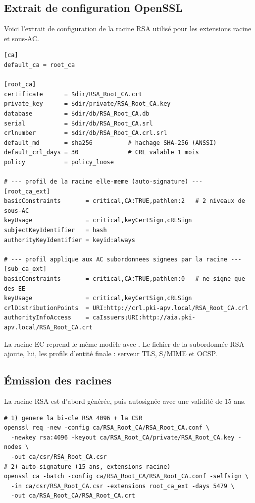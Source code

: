 \documentclass[11pt,a4paper]{article}
\newcommand{\file}[1]{\texttt{\detokenize{#1}}}
\begin{document}
\subsection{Extrait de configuration OpenSSL}
Voici l'extrait de configuration de la racine RSA utilisé pour les extensions racine et sous-AC.

\begin{lstlisting}[style=config]
[ca]
default_ca = root_ca

[root_ca]
certificate      = $dir/RSA_Root_CA.crt
private_key      = $dir/private/RSA_Root_CA.key
database         = $dir/db/RSA_Root_CA.db
serial           = $dir/db/RSA_Root_CA.srl
crlnumber        = $dir/db/RSA_Root_CA.crl.srl
default_md       = sha256          # hachage SHA-256 (ANSSI)
default_crl_days = 30              # CRL valable 1 mois
policy           = policy_loose

# --- profil de la racine elle-meme (auto-signature) ---
[root_ca_ext]
basicConstraints       = critical,CA:TRUE,pathlen:2   # 2 niveaux de sous-AC
keyUsage               = critical,keyCertSign,cRLSign
subjectKeyIdentifier   = hash
authorityKeyIdentifier = keyid:always

# --- profil applique aux AC subordonnees signees par la racine ---
[sub_ca_ext]
basicConstraints       = critical,CA:TRUE,pathlen:0   # ne signe que des EE
keyUsage               = critical,keyCertSign,cRLSign
crlDistributionPoints  = URI:http://crl.pki-apv.local/RSA_Root_CA.crl
authorityInfoAccess    = caIssuers;URI:http://aia.pki-apv.local/RSA_Root_CA.crt
\end{lstlisting}

La racine EC reprend le même modèle avec \file{pathlen:1}. Le fichier de la subordonnée RSA ajoute, lui, les profils d'entité finale : serveur TLS, S/MIME et OCSP.

\subsection{Émission des racines}
La racine RSA est d'abord générée, puis autosignée avec une validité de 15 ans.

\begin{lstlisting}[style=shellcmd]
# 1) genere la bi-cle RSA 4096 + la CSR
openssl req -new -config ca/RSA_Root_CA/RSA_Root_CA.conf \
  -newkey rsa:4096 -keyout ca/RSA_Root_CA/private/RSA_Root_CA.key -nodes \
  -out ca/csr/RSA_Root_CA.csr
# 2) auto-signature (15 ans, extensions racine)
openssl ca -batch -config ca/RSA_Root_CA/RSA_Root_CA.conf -selfsign \
  -in ca/csr/RSA_Root_CA.csr -extensions root_ca_ext -days 5479 \
  -out ca/RSA_Root_CA/RSA_Root_CA.crt
\end{lstlisting}
\end{document}
